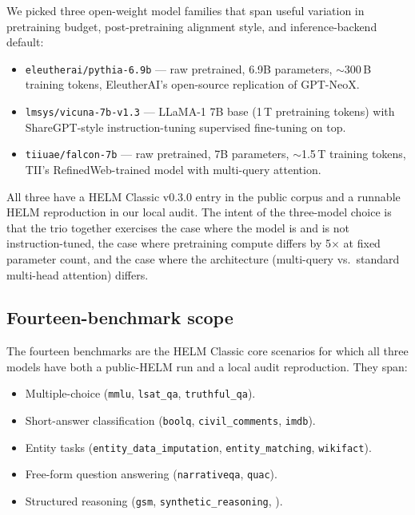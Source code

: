 \documentclass[11pt]{article}
\begin{document}
We picked three open-weight model families that span useful variation
  in pretraining budget, post-pretraining alignment style, and
  inference-backend default:

\begin{itemize}
  \item \texttt{eleutherai/pythia-6.9b} --- raw pretrained, 6.9B
        parameters, $\sim$300\,B training tokens, EleutherAI's
        open-source replication of GPT-NeoX.
  \item \texttt{lmsys/vicuna-7b-v1.3} --- LLaMA-1 7B base
        (1\,T pretraining tokens) with ShareGPT-style
        instruction-tuning supervised fine-tuning on top.
  \item \texttt{tiiuae/falcon-7b} --- raw pretrained, 7B parameters,
        $\sim$1.5\,T training tokens, TII's RefinedWeb-trained model
        with multi-query attention.
\end{itemize}

All three have a HELM Classic v0.3.0 entry in the public corpus and
  a runnable HELM reproduction in our local audit.
The intent of the three-model choice is that the trio together
  exercises the case where the model is and is not instruction-tuned,
  the case where pretraining compute differs by 5$\times$ at fixed
  parameter count, and the case where the architecture
  (multi-query vs.\ standard multi-head attention) differs.

\subsection{Fourteen-benchmark scope}
\label{sec:tr-slim-benchmarks}

The fourteen benchmarks are the HELM Classic core scenarios for which
  all three models have both a public-HELM run and a local audit
  reproduction.
They span:
\begin{itemize}
  \item Multiple-choice
        (\texttt{mmlu}, \texttt{lsat\_qa}, \texttt{truthful\_qa}).
  \item Short-answer classification
        (\texttt{boolq}, \texttt{civil\_comments}, \texttt{imdb}).
  \item Entity tasks
        (\texttt{entity\_data\_imputation},
         \texttt{entity\_matching},
         \texttt{wikifact}).
  \item Free-form question answering
        (\texttt{narrativeqa}, \texttt{quac}).
  \item Structured reasoning
        (\texttt{gsm}, \texttt{synthetic\_reasoning},
         ).
\end{itemize}
\end{document}
